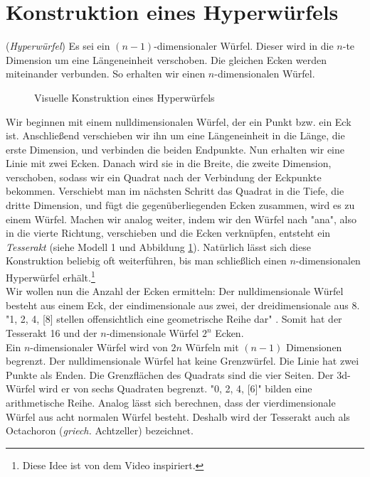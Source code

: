 \newpage
\section{Konstruktion eines Hyperwürfels}
\begin{definition} (\emph{Hyperwürfel}) Es sei ein $(n-1)$-dimensionaler Würfel. Dieser wird in die $n$-te Dimension um eine Längeneinheit verschoben. Die gleichen Ecken werden miteinander verbunden. So erhalten wir einen $n$-dimensionalen Würfel.
\end{definition}

\begin{figure}[h]
\centering

\caption{Visuelle Konstruktion eines Hyperwürfels}
\label{Wuerfel}
\end{figure}

Wir beginnen mit einem nulldimensionalen Würfel, der ein Punkt bzw. ein Eck ist.
Anschließend verschieben wir ihn um eine Längeneinheit in die Länge, die erste Dimension, und verbinden die beiden Endpunkte. Nun erhalten wir eine Linie mit zwei Ecken. 
Danach wird sie in die Breite, die zweite Dimension, verschoben, sodass wir ein Quadrat nach der Verbindung der Eckpunkte bekommen. Verschiebt man im nächsten Schritt das Quadrat in die Tiefe, die dritte Dimension, und fügt die gegenüberliegenden Ecken zusammen, wird es zu einem Würfel. Machen wir analog weiter, indem wir den Würfel nach "ana", also in die vierte Richtung, verschieben und die Ecken verknüpfen,  entsteht ein \emph{Tesserakt} (siehe Modell 1 und Abbildung \ref{Wuerfel}). Natürlich lässt sich diese Konstruktion beliebig oft weiterführen, bis man schließlich einen $n$-dimensionalen Hyperwürfel erhält.\footnote{Diese Idee ist von dem Video \cite{Ted} inspiriert.}
\\ \indent Wir wollen nun die Anzahl der Ecken ermitteln: Der nulldimensionale Würfel besteht aus einem Eck, der eindimensionale aus zwei, der dreidimensionale aus 8. "1, 2, 4, [8] stellen offensichtlich eine geometrische Reihe dar" \cite[S. 88]{Flatland}. Somit hat der Tesserakt 16 und der $n$-dimensionale Würfel $2^n$ Ecken. 
\\ \indent Ein $n$-dimensionaler Würfel wird von $2n$ Würfeln mit $(n-1)$ Dimensionen begrenzt. Der nulldimensionale Würfel hat keine Grenzwürfel. Die Linie hat zwei Punkte als Enden. Die Grenzflächen des Quadrats sind die vier Seiten. Der 3d-Würfel wird er von sechs Quadraten begrenzt. "0, 2, 4, [6]" \cite[S. 89]{Flatland} bilden eine arithmetische Reihe. Analog lässt sich berechnen, dass der vierdimensionale Würfel aus acht normalen Würfel besteht. Deshalb wird der Tesserakt auch als Octachoron (\textit{griech.} Achtzeller) bezeichnet.



